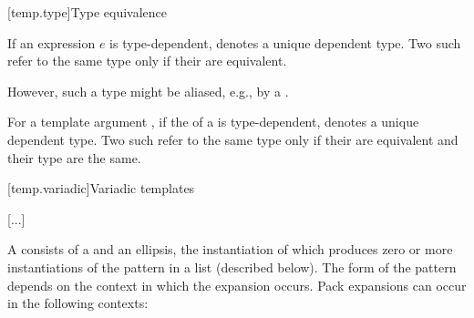 \documentclass{wg21}
\begin{document}
%
%
\begin{bnf}
    \br
    \br
    \br
\end{bnf}


[temp.type]{Type equivalence}

\pnum
If an expression $e$ is type-dependent,
denotes a unique dependent type. Two such 
refer to the same type only if their  are
equivalent.
\begin{note}
    However, such a type might be aliased,
    e.g., by a .
\end{note}

\begin{addedblock}
For a template argument , if the  of a  is type-dependent,
 denotes a unique dependent type.
Two such  refer to the same type only if their  are
equivalent and their type are the same.
\end{addedblock}

[temp.variadic]{Variadic templates}

\textcolor{noteclr}{[...]}

\pnum
{}%
A 
consists of a  and an ellipsis, the instantiation of which
produces zero or more instantiations of the pattern in a list (described below).
The form of the pattern
depends on the context in which the expansion occurs. Pack
expansions can occur in the following contexts:
\end{document}
